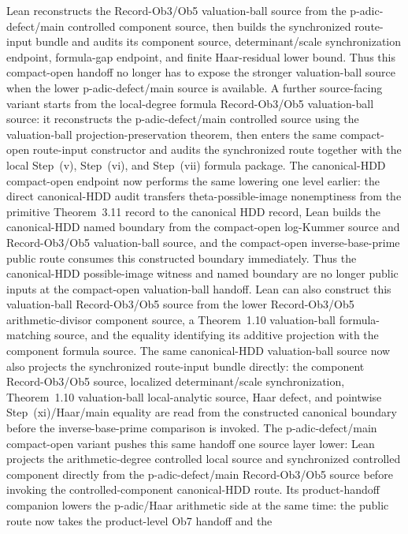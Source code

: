 \begin{proposition}
  Lean reconstructs the Record-Ob3/Ob5 valuation-ball source from the
  p-adic-defect/main controlled component source, then builds the synchronized
  route-input bundle and audits its component source, determinant/scale
  synchronization endpoint, formula-gap endpoint, and finite Haar-residual
  lower bound.  Thus this compact-open handoff no longer has to expose the
  stronger valuation-ball source when the lower p-adic-defect/main source is
  available.
  A further source-facing variant starts from the local-degree formula
  Record-Ob3/Ob5 valuation-ball source: it reconstructs the p-adic-defect/main
  controlled source using the valuation-ball projection-preservation theorem,
  then enters the same compact-open route-input constructor and audits the
  synchronized route together with the local Step~(v), Step~(vi), and
  Step~(vii) formula package.
  The canonical-HDD compact-open endpoint now performs the same lowering one
  level earlier: the direct canonical-HDD audit transfers theta-possible-image
  nonemptiness from the primitive Theorem~3.11 record to the canonical HDD
  record, Lean builds the canonical-HDD named boundary from the compact-open
  log-Kummer source and Record-Ob3/Ob5 valuation-ball source, and the
  compact-open inverse-base-prime public route consumes this constructed
  boundary immediately.  Thus the canonical-HDD possible-image witness and
  named boundary are no longer public inputs at the compact-open
  valuation-ball handoff.  Lean can also construct this valuation-ball
  Record-Ob3/Ob5 source from the lower Record-Ob3/Ob5 arithmetic-divisor
  component source, a Theorem~1.10 valuation-ball formula-matching source, and
  the equality identifying its additive projection with the component formula
  source.  The same canonical-HDD valuation-ball source now
  also projects the synchronized route-input bundle directly: the component
  Record-Ob3/Ob5 source, localized determinant/scale synchronization,
  Theorem~1.10 valuation-ball local-analytic source, Haar defect, and
  pointwise Step~(xi)/Haar/main equality are read from the constructed
  canonical boundary before the inverse-base-prime comparison is invoked.
  The p-adic-defect/main compact-open variant pushes this same handoff one
  source layer lower: Lean projects the arithmetic-degree controlled local
  source and synchronized controlled component directly from the
  p-adic-defect/main Record-Ob3/Ob5 source before invoking the
  controlled-component canonical-HDD route.
  Its product-handoff companion lowers the p-adic/Haar arithmetic side at the
  same time: the public route now takes the product-level Ob7 handoff and the

\end{proposition}
